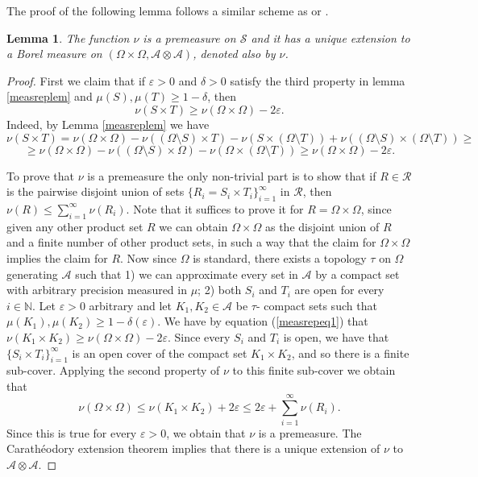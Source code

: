 \documentclass[a4wider]{amsart}
\newtheorem{lemma}[theorem]{Lemma}
\theoremstyle{definitionbreak}\newtheorem{D}[theorem]{Definition}
\theoremstyle{definitionbreak}\newtheorem*{D*}{Definition}
\begin{document}
The proof of the following lemma follows a similar scheme as \cite[Lemma A.10]{pablo} or \cite[Theorem 454D]{fremlin}. 

\begin{lemma}\label{measreplem2} The function $\nu$ is a premeasure on $\mathcal{S}$ and it has a unique extension to a Borel measure on $(\Omega\times\Omega,\mathcal{A}\otimes\mathcal{A})$, denoted also by $\nu$.
\end{lemma}

\begin{proof}  First we claim that if $\varepsilon>0$ and $\delta>0$ satisfy the third property in lemma \ref{measreplem} and $\mu(S),\mu(T)\geq 1-\delta$, then 
\begin{equation}\label{measrepeq1}
\nu(S\times T) \geq \nu(\Omega\times\Omega)-2\varepsilon.
\end{equation}
Indeed, by Lemma \ref{measreplem} we have
$$\nu(S\times T)=\nu(\Omega\times\Omega)-\nu((\Omega\setminus S)\times T)-\nu(S\times(\Omega\setminus T))+\nu((\Omega\setminus S)\times(\Omega\setminus T))\geq$$
$$\geq \nu(\Omega\times \Omega)-\nu((\Omega\setminus S)\times\Omega)-\nu(\Omega\times(\Omega\setminus T))\geq \nu(\Omega\times\Omega)-2\varepsilon.$$


To prove that $\nu$ is a premeasure the only non-trivial part is to show that if $R\in\mathcal{R}$ is the pairwise disjoint union of sets $\{R_i=S_i\times T_i\}_{i=1}^\infty$ in $\mathcal{R}$, then $\nu(R)\leq\sum_{i=1}^\infty\nu(R_i)$. Note that it suffices to prove it for $R=\Omega\times\Omega$, since given any other product set $R$ we can obtain $\Omega\times\Omega$ as the disjoint union of $R$ and a finite number of other product sets, in such a way that the claim for $\Omega\times\Omega$ implies the claim for $R$. Now since $\Omega$ is standard, there exists a topology $\tau$ on $\Omega$ generating $\mathcal{A}$ such that 1) we can approximate every set in $\mathcal{A}$ by a compact set with arbitrary precision measured in $\mu$; 2) both $S_i$ and $T_i$ are open for every $i\in\mathbb{N}$. Let $\varepsilon>0$ arbitrary and let $K_1,K_2\in\mathcal{A}$ be $\tau$- compact sets such that $\mu(K_1),\mu(K_2)\geq 1-\delta(\varepsilon)$. We have by equation (\ref{measrepeq1}) that $\nu(K_1\times K_2)\geq \nu(\Omega\times\Omega)-2\varepsilon$. Since every $S_i$ and $T_i$ is open, we have that $\{S_i\times T_i\}_{i=1}^\infty$ is an open cover of the compact set $K_1\times K_2$, and so there is a finite sub-cover. Applying the second property of $\nu$ to this finite sub-cover we obtain that 
$$\nu(\Omega\times\Omega)\leq \nu(K_1\times K_2)+2\varepsilon\leq 2\varepsilon+\sum_{i=1}^\infty \nu(R_i).$$ Since this is true for every $\varepsilon>0$, we obtain that $\nu$ is a premeasure. The Carath\'eodory extension theorem implies that there is a unique extension of $\nu$ to $\mathcal{A}\otimes\mathcal{A}$.
\end{proof}
\end{document}
